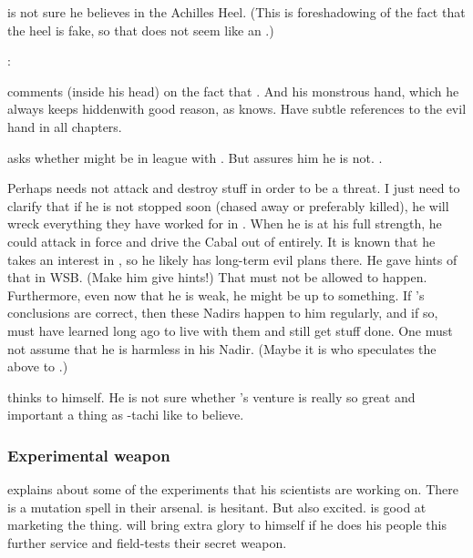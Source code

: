 \Azraid{} is not sure he believes in the Achilles Heel. 
(This is foreshadowing of the fact that the heel is fake, so that does not seem like an .) 

\begin{prose}
  \Azraid: 
\end{prose}


\Teshrial{} comments (inside his head) on the fact that . 
And his monstrous hand, which he always keeps hidden\dash with good reason, as \Teshrial{} knows. 
Have subtle references to the evil hand in all \Azraid{} chapters. 

\Azraid{} asks whether \Ishnaruchaefir{} might be in league with \Secherdamon. 
But \Teshrial{} assures him he is not. 
. 

Perhaps \Ishnaruchaefir needs not attack and destroy stuff in order to be a threat. 
I just need to clarify that if he is not stopped soon (chased away or preferably killed), he will wreck everything they have worked for in \Malcur.
When he is at his full strength, he could attack in force and drive the Cabal out of \Malcur entirely.
It is known that he takes an interest in \Malcur, so he likely has long-term evil plans there.
He gave hints of that in WSB. (Make him give hints!)
That must not be allowed to happen.
Furthermore, even now that he is weak, he might be up to something.
If \Urizeth's conclusions are correct, then these Nadirs happen to him regularly, and if so, \Ishnaruchaefir must have learned long ago to live with them and still get stuff done.
One must not assume that he is harmless in his Nadir.
(Maybe it is \Azraid who speculates the above to \Teshrial.)

\Azraid thinks to himself. 
He is not sure whether \Teshrial's \Malcur venture is really so great and important a thing as \Teshrial-tachi like to believe. 





\subsubsection{Experimental weapon}
\Azraid{} explains about some of the experiments that his scientists are working on. 
There is a mutation spell in their arsenal. 
\Teshrial{} is hesitant. 
But also excited.
\Azraid{} is good at marketing the thing. 
\Teshrial{} will bring extra glory to himself if he does his people this further service and field-tests their secret weapon. 

